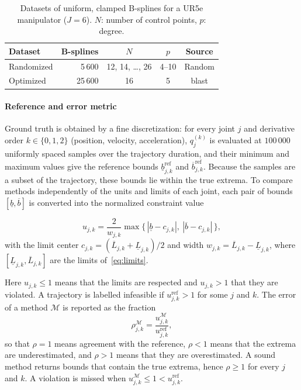 \documentclass[final,5p,times,twocolumn]{elsarticle}
\theoremstyle{definition}
\begin{document}
\begin{table}[!htbp]
\centering
\caption{Datasets of uniform, clamped B-splines for a UR5e manipulator ($J=6$). $N$: number of control points, $p$: degree.}
\label{tab:datasets}
\small
\setlength{\tabcolsep}{4pt}
\begin{tabular}{lrccc}
\toprule
Dataset & B-splines & $N$ & $p$ & Source \\
\midrule
Randomized & 5\,600  & 12, 14, \dots, 26 & 4--10 & Random \\
Optimized  & 25\,600 & 16     & 5     & blast  \\
\bottomrule
\end{tabular}
\end{table}

\paragraph*{Reference and error metric}
Ground truth is obtained by a fine discretization: for every joint $j$ and derivative order
$k\in\{0,1,2\}$ (position, velocity, acceleration), $q_j^{(k)}$ is evaluated at $100\,000$ uniformly
spaced samples over the trajectory duration, and their minimum and maximum values give the
reference bounds $\underline{b}^{\mathrm{ref}}_{j,k}$ and $\overline{b}^{\mathrm{ref}}_{j,k}$. Because
the samples are a subset of the trajectory, these bounds lie within the true extrema.
To compare methods independently of the units and limits of each joint, each pair of bounds
$[\underline{b},\overline{b}]$ is converted into the normalized constraint value

\begin{equation}
  u_{j,k}=\frac{2}{w_{j,k}}\max\big\{\,|\underline{b}-c_{j,k}|,\ |\overline{b}-c_{j,k}|\,\big\},
\end{equation}
with the limit center $c_{j,k}=(\overline{L}_{j,k}+\underline{L}_{j,k})/2$ and width
$w_{j,k}=\overline{L}_{j,k}-\underline{L}_{j,k}$, where $[\underline{L}_{j,k},\overline{L}_{j,k}]$
are the limits of~\eqref{eq:limits}.

Here $u_{j,k}\le1$ means that the limits are respected and $u_{j,k}>1$ that they are violated. A trajectory is labelled
infeasible if $u^{\mathrm{ref}}_{j,k}>1$ for some $j$ and $k$. The error of a method $\mathcal{M}$ is
reported as the fraction
\begin{equation}
  \rho^{\mathcal{M}}_{j,k}=\frac{u^{\mathcal{M}}_{j,k}}{u^{\mathrm{ref}}_{j,k}},
\end{equation}
so that $\rho=1$ means agreement with the reference, $\rho<1$ means that the extrema are
underestimated, and $\rho>1$ means that they are overestimated. A sound method returns bounds that
contain the true extrema, hence $\rho\ge1$ for every $j$ and $k$. A violation is missed when
$u^{\mathcal{M}}_{j,k}\le1<u^{\mathrm{ref}}_{j,k}$.
\end{document}
